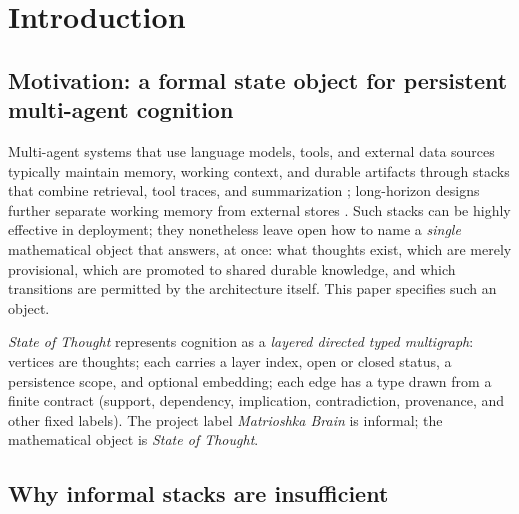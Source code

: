 \section{Introduction}
\label{sec:introduction}

\subsection{Motivation: a formal state object for persistent multi-agent cognition}
\label{subsec:intro-motivation}

Multi-agent systems that use language models, tools, and external data sources typically maintain memory, working context, and durable artifacts through stacks that combine retrieval, tool traces, and summarization \citep{yao2023react,qin2024toollearning}; long-horizon designs further separate working memory from external stores \citep{packer2024memgpt}.
Such stacks can be highly effective in deployment; they nonetheless leave open how to name a \emph{single} mathematical object that answers, at once: what thoughts exist, which are merely provisional, which are promoted to shared durable knowledge, and which transitions are permitted by the architecture itself.
This paper specifies such an object.

\emph{State of Thought} represents cognition as a \emph{layered directed typed multigraph}: vertices are thoughts; each carries a layer index, open or closed status, a persistence scope, and optional embedding; each edge has a type drawn from a finite contract (support, dependency, implication, contradiction, provenance, and other fixed labels).
The project label \emph{Matrioshka Brain} is informal; the mathematical object is \emph{State of Thought}.

\subsection{Why informal stacks are insufficient}
\label{subsec:intro-insufficient}

